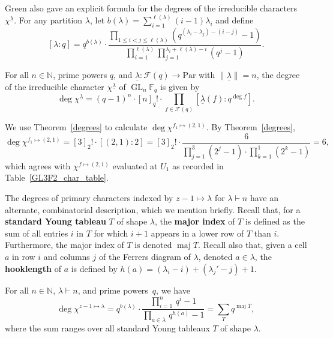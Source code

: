 \documentclass[Unicode,ALCO]{cedram}
\DeclareMathOperator{\GL}{GL}
\DeclareMathOperator{\maj}{maj}
\newcommand{\F}{\mathbb{F}}
\newcommand{\CF}{\mathcal{F}}
\newcommand{\N}{\mathbb{N}}
\newcommand{\myemph}{\textbf}
\newcommand{\Par}{\text{Par}}
\newcommand{\ulambda}{{\underline{\lambda}}}
\begin{document}
Green also gave an explicit formula for the degrees of the irreducible characters $\chi^\ulambda$.
For any partition $\lambda$, let $b(\lambda) = \sum_{i=1}^{\ell(\lambda)} (i-1)\lambda_i$ and define
\begin{equation}
\left [ \lambda : q \right ] = q^{b(\lambda)} \cdot \frac{\prod_{1 \leq i < j \leq \ell(\lambda)} \left ( q^{(\lambda_i - \lambda_j) - (i - j)} - 1 \right )}{\prod_{i=1}^{\ell(\lambda)} \prod_{j=1}^{\lambda_i + \ell(\lambda) - i} (q^j-1)}.
\end{equation}

\begin{theorem}
\label{degrees}
For all \(n \in \N\), prime powers \(q\), and $\ulambda : \CF (q) \to \Par$ with $\| \ulambda \| = n$,
the degree of the irreducible character $\chi^\ulambda$ of $\GL_n \F_q$ is given by
\begin{equation}
\deg \chi^\ulambda = (q-1)^n \cdot [n]_q! \cdot \prod_{f \in \CF (q)} \left [ \ulambda (f) : q^{\deg f} \right ].
\end{equation}
\end{theorem}

\begin{example}
We use Theorem~\ref{degrees} to calculate $\deg \chi^{f_1 \mapsto (2,1)}$.
By Theorem~\ref{degrees},
\[
\deg \chi^{f_1 \mapsto (2,1)}
=
[3]_2! \cdot [(2,1): 2]
=
[3]_2! \cdot \frac{6}{\prod_{j=1}^3 (2^j-1) \cdot \prod_{k=1}^1 (2^k-1)} = 6,
\]
which agrees with \(\chi^{f \mapsto (2,1)}\) evaluated at \(U_1\) as recorded in Table~\ref{GL3F2_char_table}.
\end{example}



The degrees of primary characters indexed by \(z-1 \mapsto \lambda\) for \(\lambda \vdash n\) have an alternate, combinatorial description, which we mention briefly.
Recall that, for a \myemph{standard Young tableau} \(T\) of shape \(\lambda\), the \myemph{major index} of \(T\) is defined as the sum of all entries \(i\) in \(T\) for which \(i + 1\) appears in a lower row of \(T\) than \(i\).
Furthermore, the major index of \(T\) is denoted \(\maj T\).
Recall also that, given a cell \(a\) in row \(i\) and columns \(j\) of the Ferrers diagram of \(\lambda\), denoted \(a \in \lambda\), the \myemph{hooklength} of \(a\) is defined by \(h(a) = (\lambda_i - i) + (\lambda_j' - j) + 1\).
\begin{theorem}
For all \(n \in \N\), \(\lambda \vdash n\), and prime powers~\(q\), we have
\begin{equation}
\deg \chi^{z-1 \mapsto \lambda} = q^{b(\lambda)} \cdot \frac{\prod_{i=1}^n \, q^i - 1}{\prod_{a \in \lambda} \, q^{h(a)} - 1} = \sum_{T} q^{\maj T},
\end{equation}
where the sum ranges over all standard Young tableaux \(T\) of shape \(\lambda\).
\end{theorem}
\end{document}

